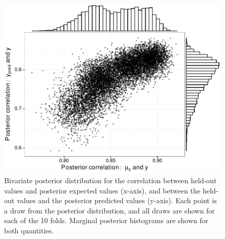 \begin{figure}[ht]\centering
\includegraphics[width=\linewidth]{figs/ch5/rho.pdf}
\caption[Bivariate posterior distribution for the correlation between held-out values and posterior expected values]{Bivariate posterior distribution for the correlation between held-out values and posterior expected values (x-axis), and between the held-out values and the posterior predicted values (y-axis). Each point is a draw from the posterior distribution, and all draws are shown for each of the 10 folds. Marginal posterior histograms are shown for both quantities.}
\label{fig:rho}
\end{figure}

